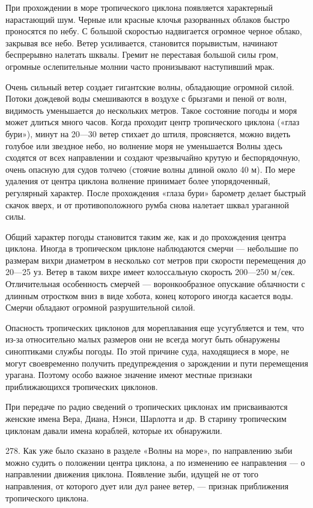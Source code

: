 При прохождении в море тропического циклона появляется характерный нарастающий шум. Черные или красные клочья разорванных облаков быстро проносятся по небу. С большой скоростью надвигается огромное черное облако, закрывая все небо. Ветер усиливается, становится порывистым, начинают беспрерывно налетать шквалы. Гремит не переставая большой силы гром, огромные ослепительные молнии часто пронизывают наступивший мрак.

Очень сильный ветер создает гигантские волны, обладающие огромной силой. Потоки дождевой воды смешиваются в воздухе с брызгами и пеной от волн, видимость уменьшается до нескольких метров. Такое состояние погоды и моря может длиться много часов. Когда проходит центр тропического циклона («глаз бури»), минут на 20—30 ветер стихает до штиля, проясняется, можно видеть голубое или звездное небо, но волнение моря не уменьшается Волны здесь сходятся от всех направлении и создают чрезвычайно крутую и беспорядочную, очень опасную для судов толчею (стоячие волны длиной около 40 м). По мере удаления от центра циклона волнение принимает более упорядоченный, регулярный характер. После прохождения «глаза бури» барометр делает быстрый скачок вверх, и от противоположного румба снова налетает шквал ураганной силы.

Общий характер погоды становится таким же, как и до прохождения центра циклона. Иногда в тропическом циклоне наблюдаются смерчи — небольшие по размерам вихри диаметром в несколько сот метров при скорости перемещения до 20—25 уз. Ветер в таком вихре имеет колоссальную скорость 200—250 м/сек. Отличительная особенность смерчей — воронкообразное опускание облачности с длинным отростком вниз в виде хобота, конец которого иногда касается воды. Смерчи обладают огромной разрушительной силой.

Опасность тропических циклонов для мореплавания еще усугубляется и тем, что из-за относительно малых размеров они не всегда могут быть обнаружены синоптиками службы погоды. По этой причине суда, находящиеся в море, не могут своевременно получить предупреждения о зарождении и пути перемещения урагана. Поэтому особо важное значение имеют местные признаки приближающихся тропических циклонов.

При передаче по радио сведений о тропических циклонах им присваиваются женские имена Вера, Диана, Нэнси, Шарлотта и др. В старину тропическим циклонам давали имена кораблей, которые их обнаружили.

278. Как уже было сказано в разделе «Волны на море», по направлению зыби можно судить о положении центра циклона, а по изменению ее направления — о направлении движения циклона. Появление зыби, идущей не от того направления, от которого дует или дул ранее ветер, — признак приближения тропического циклона.

